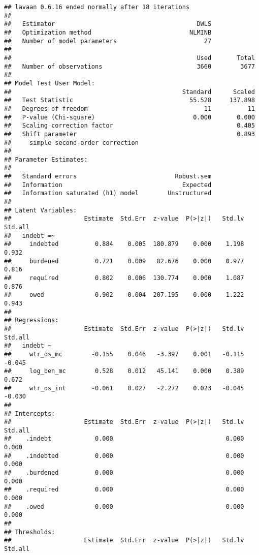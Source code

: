 \documentclass[
]{article}
\begin{document}
\begin{verbatim}
## lavaan 0.6.16 ended normally after 18 iterations
## 
##   Estimator                                       DWLS
##   Optimization method                           NLMINB
##   Number of model parameters                        27
## 
##                                                   Used       Total
##   Number of observations                          3660        3677
## 
## Model Test User Model:
##                                               Standard      Scaled
##   Test Statistic                                55.528     137.898
##   Degrees of freedom                                11          11
##   P-value (Chi-square)                           0.000       0.000
##   Scaling correction factor                                  0.405
##   Shift parameter                                            0.893
##     simple second-order correction                                
## 
## Parameter Estimates:
## 
##   Standard errors                           Robust.sem
##   Information                                 Expected
##   Information saturated (h1) model        Unstructured
## 
## Latent Variables:
##                    Estimate  Std.Err  z-value  P(>|z|)   Std.lv  Std.all
##   indebt =~                                                             
##     indebted          0.884    0.005  180.879    0.000    1.198    0.932
##     burdened          0.721    0.009   82.676    0.000    0.977    0.816
##     required          0.802    0.006  130.774    0.000    1.087    0.876
##     owed              0.902    0.004  207.195    0.000    1.222    0.943
## 
## Regressions:
##                    Estimate  Std.Err  z-value  P(>|z|)   Std.lv  Std.all
##   indebt ~                                                              
##     wtr_os_mc        -0.155    0.046   -3.397    0.001   -0.115   -0.045
##     log_ben_mc        0.528    0.012   45.141    0.000    0.389    0.672
##     wtr_os_int       -0.061    0.027   -2.272    0.023   -0.045   -0.030
## 
## Intercepts:
##                    Estimate  Std.Err  z-value  P(>|z|)   Std.lv  Std.all
##    .indebt            0.000                               0.000    0.000
##    .indebted          0.000                               0.000    0.000
##    .burdened          0.000                               0.000    0.000
##    .required          0.000                               0.000    0.000
##    .owed              0.000                               0.000    0.000
## 
## Thresholds:
##                    Estimate  Std.Err  z-value  P(>|z|)   Std.lv  Std.all

\end{verbatim}
\end{document}
